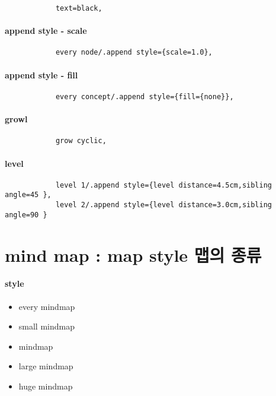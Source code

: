 \documentclass[12pt, a4paper, oneside]{book}
\let\stdsection\section
\renewcommand\section{\newpage\stdsection}
\begin{document}
			\begin{verbatim}
			text=black,
			\end{verbatim}

		\paragraph{append style - scale}

			\begin{verbatim}
			every node/.append style={scale=1.0},
			\end{verbatim}

		\paragraph{append style - fill}

			\begin{verbatim}
			every concept/.append style={fill={none}},
			\end{verbatim}

		\paragraph{growl}
			\begin{verbatim}
			grow cyclic,
			\end{verbatim}

		\paragraph{level}
			\begin{verbatim}
			level 1/.append style={level distance=4.5cm,sibling angle=45 },
			level 2/.append style={level distance=3.0cm,sibling angle=90 }
			\end{verbatim}



	\section{mind map : map style 맵의 종류} 


		\paragraph{style}
			\begin{itemize}
			\item 	every mindmap
			\item 	small mindmap
			\item 	mindmap
			\item 	large mindmap
			\item 	huge mindmap
			\end{itemize}
\end{document}
